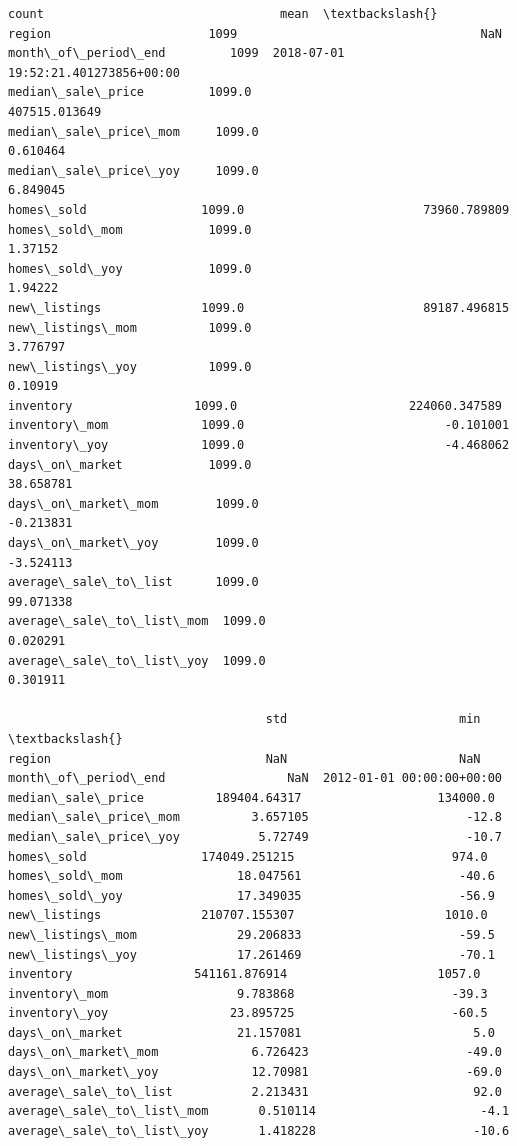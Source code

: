\documentclass[11pt]{article}
\begin{document}
\begin{tcolorbox}[breakable, size=fbox, boxrule=.5pt, pad at break*=1mm, opacityfill=0]
\begin{Verbatim}[commandchars=\\\{\}]
                           count                                 mean  \textbackslash{}
region                      1099                                  NaN
month\_of\_period\_end         1099  2018-07-01 19:52:21.401273856+00:00
median\_sale\_price         1099.0                        407515.013649
median\_sale\_price\_mom     1099.0                             0.610464
median\_sale\_price\_yoy     1099.0                             6.849045
homes\_sold                1099.0                         73960.789809
homes\_sold\_mom            1099.0                              1.37152
homes\_sold\_yoy            1099.0                              1.94222
new\_listings              1099.0                         89187.496815
new\_listings\_mom          1099.0                             3.776797
new\_listings\_yoy          1099.0                              0.10919
inventory                 1099.0                        224060.347589
inventory\_mom             1099.0                            -0.101001
inventory\_yoy             1099.0                            -4.468062
days\_on\_market            1099.0                            38.658781
days\_on\_market\_mom        1099.0                            -0.213831
days\_on\_market\_yoy        1099.0                            -3.524113
average\_sale\_to\_list      1099.0                            99.071338
average\_sale\_to\_list\_mom  1099.0                             0.020291
average\_sale\_to\_list\_yoy  1099.0                             0.301911

                                    std                        min  \textbackslash{}
region                              NaN                        NaN
month\_of\_period\_end                 NaN  2012-01-01 00:00:00+00:00
median\_sale\_price          189404.64317                   134000.0
median\_sale\_price\_mom          3.657105                      -12.8
median\_sale\_price\_yoy           5.72749                      -10.7
homes\_sold                174049.251215                      974.0
homes\_sold\_mom                18.047561                      -40.6
homes\_sold\_yoy                17.349035                      -56.9
new\_listings              210707.155307                     1010.0
new\_listings\_mom              29.206833                      -59.5
new\_listings\_yoy              17.261469                      -70.1
inventory                 541161.876914                     1057.0
inventory\_mom                  9.783868                      -39.3
inventory\_yoy                 23.895725                      -60.5
days\_on\_market                21.157081                        5.0
days\_on\_market\_mom             6.726423                      -49.0
days\_on\_market\_yoy             12.70981                      -69.0
average\_sale\_to\_list           2.213431                       92.0
average\_sale\_to\_list\_mom       0.510114                       -4.1
average\_sale\_to\_list\_yoy       1.418228                      -10.6


\end{Verbatim}
\end{tcolorbox}
\end{document}

